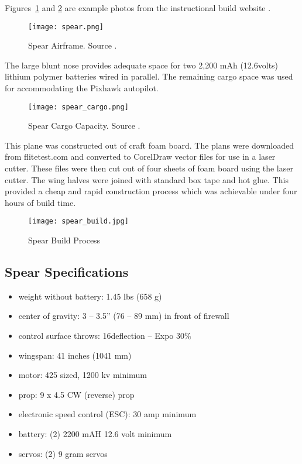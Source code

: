 Figures~\ref{fig:spear} and \ref{fig:spear_cargo} are example photos from the instructional build website \cite{flitetest}.

\begin{figure}[!h]
 \centering
  \texttt{[image: spear.png]}
  \caption{Spear Airframe.  Source \cite{flitetest}.}
  \label{fig:spear}
\end{figure}

The large blunt nose provides adequate space for two 2,200 mAh (12.6volts) lithium polymer batteries wired in parallel.  The remaining cargo space was used for accommodating the Pixhawk autopilot.

\begin{figure}[!h]
 \centering
  \texttt{[image: spear\_cargo.png]}
  \caption{Spear Cargo Capacity.  Source \cite{flitetest}.}
  \label{fig:spear_cargo}
\end{figure}

This plane was constructed out of craft foam board.  The plans were downloaded from flitetest.com\cite{flitetest} and converted to CorelDraw vector files for use in a laser cutter.  These files were then cut out of four sheets of foam board using the laser cutter.  The wing halves were joined with standard box tape and hot glue.  This provided a cheap and rapid construction process which was achievable under four hours of build time.

\begin{figure}[!h]
 \centering
  \texttt{[image: spear\_build.jpg]}
  \caption{Spear Build Process}
  \label{fig:spear_build}
\end{figure}

\subsection{Spear Specifications}
\begin{itemize}
 \item weight without battery: 1.45 lbs (658 g)
 \item center of gravity: 3 – 3.5” (76 – 89 mm) in front of firewall
 \item control surface throws: 16\degrees  deflection – Expo 30\%
 \item wingspan: 41 inches (1041 mm)
 \item motor: 425 sized, 1200 kv minimum
 \item prop: 9 x 4.5 CW (reverse) prop
 \item electronic speed control (ESC): 30 amp minimum
 \item battery: (2) 2200 mAH 12.6 volt minimum
 \item servos: (2) 9 gram servos 
\end{itemize}

